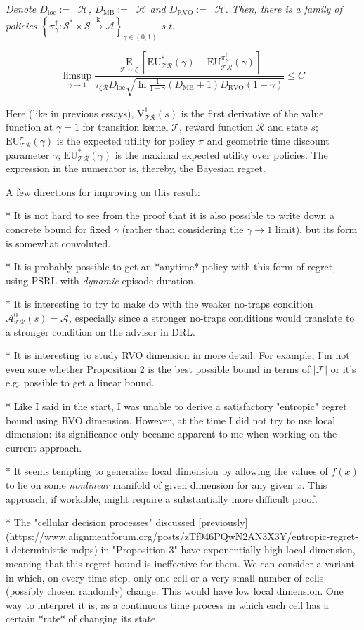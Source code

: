 \documentclass[a4paper]{article}
\newcommand{\Co}[1]{}
\newcommand{\AP}[1]{\left(#1\right)}
\newcommand{\AB}[1]{\left[#1\right]}
\newcommand{\AC}[1]{\left\{#1\right\}}
\newcommand{\Ea}[2]{\underset{#1}{\operatorname{E}}\AB{#2}}
\newcommand{\Abs}[1]{\left\vert #1 \right\vert}
\newcommand{\K}{\xrightarrow{\mathrm{k}}}
\newcommand{\F}{\mathcal{F}}
\newcommand{\St}{\mathcal{S}}
\newcommand{\A}{\mathcal{A}}
\newcommand{\R}{\mathcal{R}}
\newcommand{\T}{\mathcal{T}}
\newcommand{\Hy}{\mathcal{H}}
\DeclareMathOperator{\RVO}{\dim_{RVO}}
\DeclareMathOperator{\MB}{\dim_{MB}}
\DeclareMathOperator{\LD}{\dim_{loc}}
\newcommand{\DRVO}{D_{\mathrm{RVO}}}
\newcommand{\DMB}{D_{\mathrm{MB}}}
\newcommand{\DL}{D_{\mathrm{loc}}}
\newcommand{\V}{\mathrm{V}}
\newcommand{\EU}{\mathrm{EU}}
\begin{document}
\textit{Denote $\DL:=\LD{\Hy}$, $\DMB:=\MB{\Hy}$ and $\DRVO:=\RVO{\Hy}$. Then, there is a family of policies $\AC{\pi^\dagger_\gamma:\St^*\times\St\K\A}_{\gamma\in(0,1)}$ s.t.}\Co{i}

$$\limsup_{\gamma \rightarrow 1}\frac{\Ea{\T\sim\zeta}{\EU^*_{\T\R}(\gamma)-\EU^{\pi^\dagger_\gamma}_{\T\R}(\gamma)}}{\tau_{\zeta\R}\DL\sqrt{\ln{\frac{1}{1-\gamma}}\AP{\DMB+1}\DRVO(1-\gamma)}}\leq C$$

Here (like in previous essays), $\V^1_{\T\R}(s)$ is the first derivative of the value function at $\gamma=1$ for transition kernel $\T$, reward function $\R$ and state $s$; $\EU^{\pi}_{\T\R}(\gamma)$ is the expected utility for policy $\pi$ and geometric time discount parameter $\gamma$; $\EU^*_{\T\R}(\gamma)$ is the maximal expected utility over policies. The expression in the numerator is, thereby, the Bayesian regret.

A few directions for improving on this result:

* It is not hard to see from the proof that it is also possible to write down a concrete bound for fixed $\gamma$ (rather than considering the $\gamma\rightarrow 1$ limit), but its form is somewhat convoluted.

* It is probably possible to get an *anytime* policy with this form of regret, using PSRL with \textit{dynamic}\Co{i} episode duration.

* It is interesting to try to make do with the weaker no-traps condition $\A^0_{\T\R}(s) = \A$, especially since a stronger no-traps conditions would translate to a stronger condition on the advisor in DRL.

* It is interesting to study RVO dimension in more detail. For example, I'm not even sure whether Proposition 2 is the best possible bound in terms of $\Abs{\F}$ or it's e.g. possible to get a linear bound.

* Like I said in the start, I was unable to derive a satisfactory "entropic" regret bound using RVO dimension. However, at the time I did not try to use local dimension: its significance only became apparent to me when working on the current approach.

* It seems tempting to generalize local dimension by allowing the values of $f(x)$ to lie on some \textit{nonlinear} manifold of given dimension for any given $x$. This approach, if workable, might require a substantially more difficult proof.

* The "cellular decision processes" discussed [previously](https://www.alignmentforum.org/posts/zTf946PQwN2AN3X3Y/entropic-regret-i-deterministic-mdps) in "Proposition 3" have exponentially high local dimension, meaning that this regret bound is ineffective for them. We can consider a variant in which, on every time step, only one cell or a very small number of cells (possibly chosen randomly) change. This would have low local dimension. One way to interpret it is, as a continuous time process in which each cell has a certain *rate* of changing its state.
\end{document}
